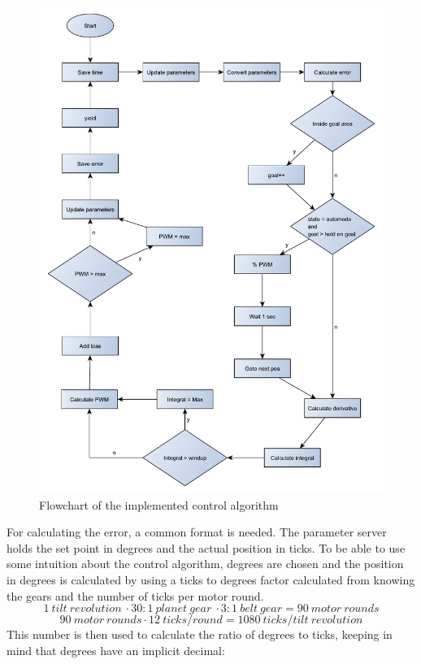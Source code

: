 \begin{figure}[htb]
	\centering
	\includegraphics[width=\textwidth,trim=0 0 0 0]{graphics/control_alg_diagram.pdf}
	\caption{Flowchart of the implemented control algorithm}
	\label{fig:pid_flow}			
\end{figure}

For calculating the error, a common format is needed. The parameter server holds the set point in degrees and the actual position in ticks. To be able to use some intuition about the control algorithm, degrees are chosen and the position in degrees is calculated by using a ticks to degrees factor calculated from knowing the gears and the number of ticks per motor round.
\begin{equation}
1 \ tilt \ revolution \ \cdot 30:1 \ planet \ gear \ \cdot 3:1 \ belt \ gear = 90 \ motor \ rounds
\end{equation}
\begin{equation}
 90 \ motor \ rounds \cdot 12 \ ticks/round = 1080 \ ticks/tilt \ revolution
\end{equation}
This number is then used to calculate the ratio of degrees to ticks, keeping in mind that degrees have an implicit decimal:

